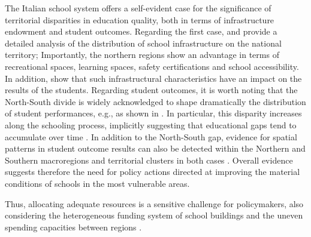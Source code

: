 \documentclass{book}
\begin{document}
The Italian school system offers a self-evident case for the significance of territorial disparities in education quality, both in terms of infrastructure endowment and student outcomes. Regarding the first case,  \cite{Garlaschi} and \cite{BDI} provide a detailed analysis of the distribution of school infrastructure on the national territory; Importantly, the northern regions show an advantage in terms of recreational spaces, learning spaces, safety certifications and school accessibility. In addition, \cite{BDI} show that such infrastructural characteristics have an impact on the results of the students. Regarding student outcomes, it is worth noting that the North-South divide is widely acknowledged to shape dramatically the distribution of student performances, e.g., as shown in \cite{Agasisti}. In particular, this disparity increases along the schooling process, implicitly suggesting that educational gaps tend to accumulate over time \citep{Invalsi2020}. In addition to the North-South gap,  evidence for spatial patterns in student outcome results can also be detected within the Northern and Southern macroregions and territorial clusters in both cases \citep[][respectively]{bag:do:north, do:bag:mar:south}. Overall evidence suggests therefore the need for policy actions directed at improving the material conditions of schools in the most vulnerable areas.

Thus, allocating adequate resources is a sensitive challenge for policymakers, also considering the heterogeneous funding system of school buildings and the uneven spending capacities between regions \citep[as in the case of Northern special statute regions, see][]{BDI}.
\end{document}
